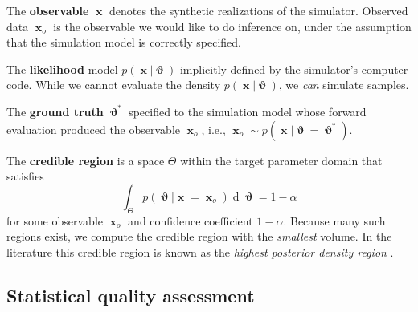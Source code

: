 \documentclass[twoside]{article}
\DeclareMathOperator{\vtheta}{\boldsymbol\vartheta}
\DeclareMathOperator{\vx}{\boldsymbol x}
\renewcommand*{\d}[1]{\operatorname{d}\!{#1}}
\begin{document}
The {\bf observable} $\vx$ denotes the synthetic realizations of the simulator. Observed data $\vx_o$ is the observable we would like to do inference on, under the assumption that the simulation model is correctly specified.

The {\bf likelihood} model $p(\vx\vert\vtheta)$ implicitly defined by the simulator's computer code. While we cannot evaluate the density $p(\vx\vert\vtheta)$, we \emph{can} simulate samples.

The {\bf ground truth} $\vtheta^*$ specified to the simulation model whose forward evaluation produced the observable $\vx_o$, i.e., $\vx_o\sim p(\vx\vert\vtheta=\vtheta^*)$.

The {\bf credible region} is a space $\Theta$ within the target parameter domain that satisfies
\begin{equation}
    \int_\Theta p(\vtheta\vert\vx=\vx_o) \d{\vtheta} = 1 - \alpha
\end{equation}
for some observable $\vx_o$ and confidence coefficient $1 - \alpha$.
Because many such regions exist, we compute the credible region with the \emph{smallest} volume. In the literature this credible region is known as 
the \emph{highest posterior density region} \citep{box2011bayesian,hyndman1996computing}.


\subsection{Statistical quality assessment}
\end{document}
